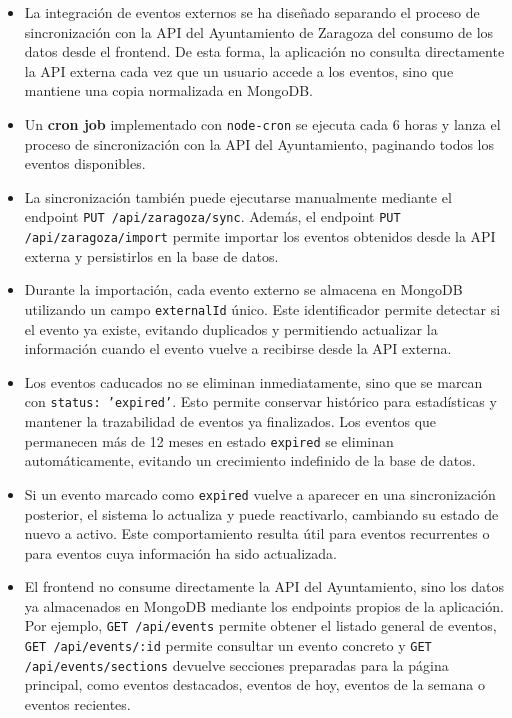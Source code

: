 \documentclass[12pt, a4paper]{article}
\begin{document}
\begin{itemize}[leftmargin=1.4em]
  \item La integración de eventos externos se ha diseñado separando el proceso de
    sincronización con la API del Ayuntamiento de Zaragoza del consumo de los datos
    desde el frontend. De esta forma, la aplicación no consulta directamente la API
    externa cada vez que un usuario accede a los eventos, sino que mantiene una copia
    normalizada en MongoDB.

  \item Un \textbf{cron job} implementado con \texttt{node-cron} se ejecuta cada 6 horas
    y lanza el proceso de sincronización con la API del Ayuntamiento, paginando todos
    los eventos disponibles.

  \item La sincronización también puede ejecutarse manualmente mediante el endpoint
    \texttt{PUT /api/zaragoza/sync}. Además, el endpoint
    \texttt{PUT /api/zaragoza/import} permite importar los eventos obtenidos desde la
    API externa y persistirlos en la base de datos.

  \item Durante la importación, cada evento externo se almacena en MongoDB utilizando
    un campo \texttt{externalId} único. Este identificador permite detectar si el evento
    ya existe, evitando duplicados y permitiendo actualizar la información cuando el
    evento vuelve a recibirse desde la API externa.

  \item Los eventos caducados no se eliminan inmediatamente, sino que se marcan con
    \texttt{status: 'expired'}. Esto permite conservar histórico para estadísticas y
    mantener la trazabilidad de eventos ya finalizados.
    Los eventos que permanecen más de 12 meses en estado \texttt{expired} se
    eliminan automáticamente, evitando un crecimiento indefinido de la base de datos.

  \item Si un evento marcado como \texttt{expired} vuelve a aparecer en una
    sincronización posterior, el sistema lo actualiza y puede reactivarlo, cambiando
    su estado de nuevo a activo. Este comportamiento resulta útil para eventos
    recurrentes o para eventos cuya información ha sido actualizada.

  \item El frontend no consume directamente la API del Ayuntamiento, sino los datos ya
    almacenados en MongoDB mediante los endpoints propios de la aplicación. Por
    ejemplo, \texttt{GET /api/events} permite obtener el listado general de eventos,
    \texttt{GET /api/events/:id} permite consultar un evento concreto y
    \texttt{GET /api/events/sections} devuelve secciones preparadas para la página
    principal, como eventos destacados, eventos de hoy, eventos de la semana o eventos
    recientes.


\end{itemize}
\end{document}
